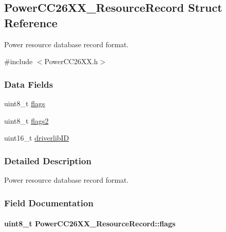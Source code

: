 \subsection{Power\+C\+C26\+X\+X\+\_\+\+Resource\+Record Struct Reference}
\label{struct_power_c_c26_x_x___resource_record}


Power resource database record format.  




{\ttfamily \#include $<$Power\+C\+C26\+X\+X.\+h$>$}

\subsubsection*{Data Fields}
\begin{DoxyCompactItemize}
\item 
uint8\+\_\+t \hyperlink{struct_power_c_c26_x_x___resource_record_a70560e127e43d54c92d7103114e216b4}{flags}
\item 
uint8\+\_\+t \hyperlink{struct_power_c_c26_x_x___resource_record_af8469571ff36b1039d0082893d44fcaa}{flags2}
\item 
uint16\+\_\+t \hyperlink{struct_power_c_c26_x_x___resource_record_a680b221cae593cd6d2d66182992c4bc6}{driverlib\+I\+D}
\end{DoxyCompactItemize}


\subsubsection{Detailed Description}
Power resource database record format. 

\subsubsection{Field Documentation}
\paragraph[{flags}]{\setlength{\rightskip}{0pt plus 5cm}uint8\+\_\+t Power\+C\+C26\+X\+X\+\_\+\+Resource\+Record\+::flags}\label{struct_power_c_c26_x_x___resource_record_a70560e127e43d54c92d7103114e216b4}
